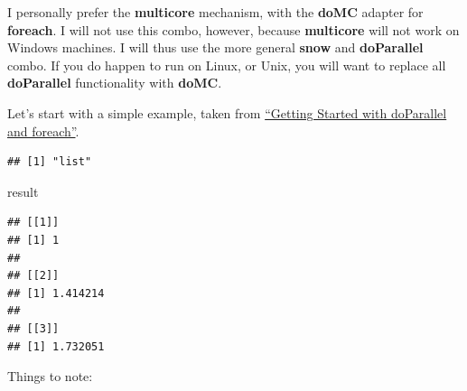 \documentclass[]{book}
\newenvironment{Shaded}{\begin{snugshade}}{\end{snugshade}}
\newcommand{\KeywordTok}[1]{\textcolor[rgb]{0.13,0.29,0.53}{\textbf{{#1}}}}
\newcommand{\DataTypeTok}[1]{\textcolor[rgb]{0.13,0.29,0.53}{{#1}}}
\newcommand{\DecValTok}[1]{\textcolor[rgb]{0.00,0.00,0.81}{{#1}}}
\newcommand{\StringTok}[1]{\textcolor[rgb]{0.31,0.60,0.02}{{#1}}}
\newcommand{\NormalTok}[1]{{#1}}
\theoremstyle{definition}
\theoremstyle{definition}
\theoremstyle{remark}
\let\BeginKnitrBlock\begin \let\EndKnitrBlock\end
\begin{document}
\BeginKnitrBlock{remark}
I personally prefer the \textbf{multicore}
mechanism, with the \textbf{doMC} adapter for \textbf{foreach}. I will
not use this combo, however, because \textbf{multicore} will not work on
Windows machines. I will thus use the more general \textbf{snow} and
\textbf{doParallel} combo. If you do happen to run on Linux, or Unix,
you will want to replace all \textbf{doParallel} functionality with
\textbf{doMC}.
\EndKnitrBlock{remark}

Let's start with a simple example, taken from
\href{http://debian.mc.vanderbilt.edu/R/CRAN/web/packages/doParallel/vignettes/gettingstartedParallel.pdf}{``Getting
Started with doParallel and foreach''}.

\begin{Shaded}
\end{Shaded}

\begin{verbatim}
## [1] "list"
\end{verbatim}

\begin{Shaded}
\begin{Highlighting}[]
\NormalTok{result}
\end{Highlighting}
\end{Shaded}

\begin{verbatim}
## [[1]]
## [1] 1
## 
## [[2]]
## [1] 1.414214
## 
## [[3]]
## [1] 1.732051
\end{verbatim}

Things to note:
\end{document}
